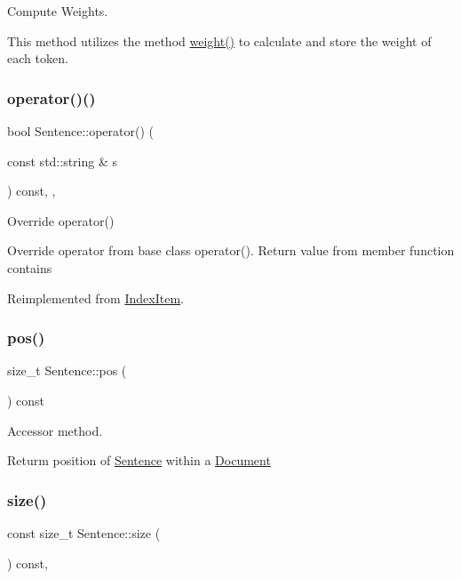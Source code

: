 Compute Weights. 

This method utilizes the method \hyperlink{class_sentence_ac7084c1822710975f94ed8a30ac73c2c}{weight()} to calculate and store the weight of each token. \mbox{\label{class_sentence_aacbd8da0eeadd6a544f00c7ea4169c79}} 
\subsubsection{\texorpdfstring{operator()()}{operator()()}}
{\footnotesize\ttfamily bool Sentence\+::operator() (\begin{DoxyParamCaption}\item[{const std\+::string \&}]{s }\end{DoxyParamCaption}) const\hspace{0.3cm}{\ttfamily [inline]}, {\ttfamily [override]}, {\ttfamily [virtual]}}



Override operator() 

Override operator from base class operator(). Return value from member function contains 

Reimplemented from \hyperlink{class_index_item_a38ccc46639b8d0b066024bad728c1bfa}{Index\+Item}.

\mbox{\label{class_sentence_af98c9ff5c5be578e7e45057ebd9b899b}} 
\subsubsection{\texorpdfstring{pos()}{pos()}}
{\footnotesize\ttfamily size\+\_\+t Sentence\+::pos (\begin{DoxyParamCaption}{ }\end{DoxyParamCaption}) const\hspace{0.3cm}{\ttfamily [inline]}}



Accessor method. 

Returm position of \hyperlink{class_sentence}{Sentence} within a \hyperlink{class_document}{Document} \mbox{\label{class_sentence_a98d70a10b7573aa295814d1326ed1164}} 
\subsubsection{\texorpdfstring{size()}{size()}}
{\footnotesize\ttfamily const size\+\_\+t Sentence\+::size (\begin{DoxyParamCaption}{ }\end{DoxyParamCaption}) const\hspace{0.3cm}{\ttfamily [override]}, {\ttfamily [virtual]}}



